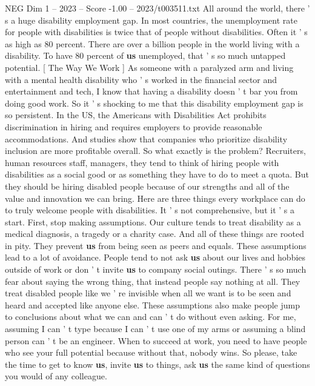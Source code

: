 \begin{textsample}{NEG Dim 1 – 2023 – Score -1.00 – 2023/t003511.txt}  \label{ex:f1_neg_016}
All around the world, there ' s a huge disability employment gap.
In most countries, the unemployment rate for people with disabilities is twice that of people without disabilities.
Often it ' s as high as 80 percent.
There are over a billion people in the world living with a disability.
To have 80 percent of \textbf{us} unemployed, that ' s so much untapped potential. [ The Way We Work ] As someone with a paralyzed arm and living with a mental health disability who ' s worked in the financial sector and entertainment and tech, I know that having a disability doesn ' t bar you from doing good work.
So it ' s shocking to me that this disability employment gap is so persistent.
In the US, the Americans with Disabilities Act prohibits discrimination in hiring and requires employers to provide reasonable accommodations.
And studies show that companies who prioritize disability inclusion are more profitable overall.
So what exactly is the problem?
Recruiters, human resources staff, managers, they tend to think of hiring people with disabilities as a social good or as something they have to do to meet a quota.
But they should be hiring disabled people because of our strengths and all of the value and innovation we can bring.
Here are three things every workplace can do to truly welcome people with disabilities.
It ' s not comprehensive, but it ' s a start.
First, stop making assumptions.
Our culture tends to treat disability as a medical diagnosis, a tragedy or a charity case.
And all of these things are rooted in pity.
They prevent \textbf{us} from being seen as peers and equals.
These assumptions lead to a lot of avoidance.
People tend to not ask \textbf{us} about our lives and hobbies outside of work or don ' t invite \textbf{us} to company social outings.
There ' s so much fear about saying the wrong thing, that instead people say nothing at all.
They treat disabled people like we ' re invisible when all we want is to be seen and heard and accepted like anyone else.
These assumptions also make people jump to conclusions about what we can and can ' t do without even asking.
For me, assuming I can ' t type because I can ' t use one of my arms or assuming a blind person can ' t be an engineer.
When to succeed at work, you need to have people who see your full potential because without that, nobody wins.
So please, take the time to get to know \textbf{us}, invite \textbf{us} to things, ask \textbf{us} the same kind of questions you would of any colleague.

\end{textsample}
